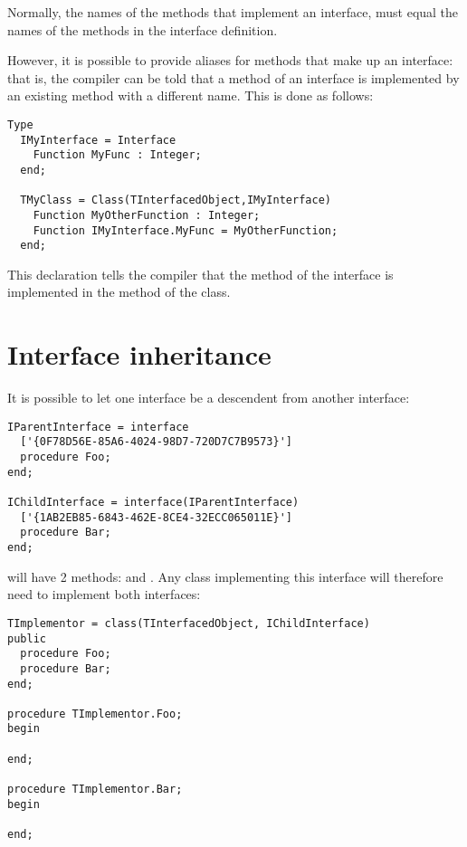 Normally, the names of the methods that implement an interface, must 
equal the names of the methods in the interface definition.

However, it is possible to provide aliases for methods that make up an
interface: that is, the compiler can be told that a method of an interface 
is implemented by an existing method with a different name. 
This is done as follows:
\begin{verbatim}
Type
  IMyInterface = Interface
    Function MyFunc : Integer;
  end;

  TMyClass = Class(TInterfacedObject,IMyInterface)
    Function MyOtherFunction : Integer;
    Function IMyInterface.MyFunc = MyOtherFunction;
  end;
\end{verbatim}
This declaration tells the compiler that the  method of
the  interface is implemented in the 
method of the  class.

\section{Interface inheritance}
It is possible to let one interface be a descendent from another interface:
\begin{verbatim}
IParentInterface = interface
  ['{0F78D56E-85A6-4024-98D7-720D7C7B9573}']
  procedure Foo;
end;
 
IChildInterface = interface(IParentInterface)
  ['{1AB2EB85-6843-462E-8CE4-32ECC065011E}']
  procedure Bar;
end;
\end{verbatim}
 will have 2 methods:  and . 
Any class implementing this interface will therefore need to implement both interfaces:
\begin{verbatim}
TImplementor = class(TInterfacedObject, IChildInterface)
public
  procedure Foo;
  procedure Bar;
end;

procedure TImplementor.Foo;
begin

end;

procedure TImplementor.Bar;
begin

end;
\end{verbatim}

